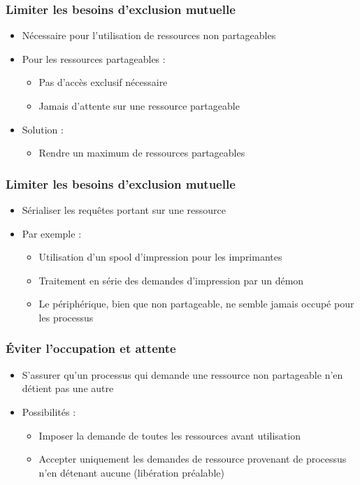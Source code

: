 \begin{frame}
\frametitle{Limiter les besoins d’exclusion mutuelle}
\begin{itemize}
\item Nécessaire pour l’utilisation de ressources non partageables
\item Pour les ressources partageables :
\begin{itemize}
\item Pas d’accès exclusif nécessaire
\item Jamais d’attente sur une ressource partageable
\end{itemize}
\item Solution : 
\begin{itemize}
\item Rendre un maximum de ressources partageables
\end{itemize}
\end{itemize}
\end{frame}

\begin{frame}
\frametitle{Limiter les besoins d’exclusion mutuelle}
\begin{itemize}
\item Sérialiser les requêtes portant sur une ressource
\item Par exemple : 
\begin{itemize}
\item Utilisation d’un spool d’impression pour les imprimantes
\item Traitement en série des demandes d’impression par un démon
\item Le périphérique, bien que non partageable, ne semble jamais occupé pour les processus
\end{itemize}
\end{itemize}
\end{frame}

\begin{frame}
\frametitle{Éviter l’occupation et attente}
\begin{itemize}
\item S’assurer qu’un processus qui demande une ressource non partageable n’en détient pas une autre
\item Possibilités :
\begin{itemize}
\item Imposer la demande de toutes les ressources avant utilisation
\item Accepter uniquement les demandes de ressource provenant de processus n’en détenant aucune (libération préalable)
\end{itemize}
\end{itemize}
\end{frame}

